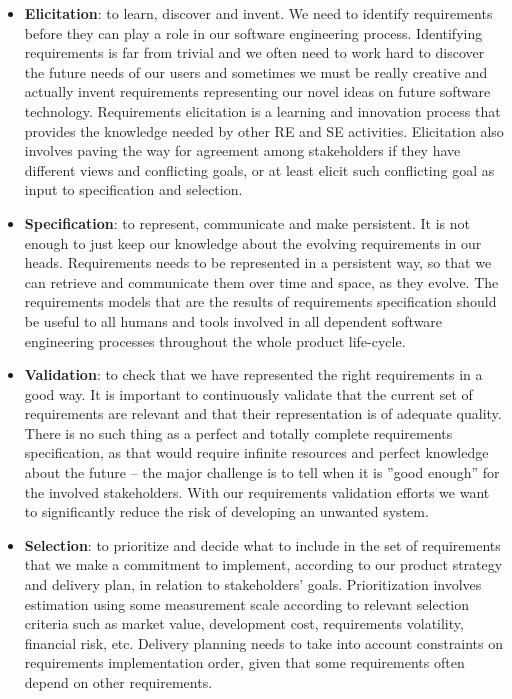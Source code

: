 \begin{itemize}
  \item \textbf{Elicitation}: to learn, discover and invent. We need to identify requirements before they can play a role in our software engineering process. Identifying requirements is far from trivial and we often need to work hard to discover the future needs of our users and sometimes we must be really creative and actually invent requirements representing our novel ideas on future software technology. Requirements elicitation is a learning and innovation process that provides the knowledge needed by other RE and SE activities. Elicitation also involves paving the way for agreement among stakeholders  if they have different views and conflicting goals, or at least elicit such conflicting goal as input to specification and selection.
  \item \textbf{Specification}: to represent, communicate and make persistent. It is not enough to just keep our knowledge about the evolving requirements in our heads. Requirements needs to be represented in a persistent way, so that we can retrieve and communicate them over time and space, as they evolve. The requirements models that are the results of requirements specification should be useful to all humans and tools involved in all dependent software engineering processes throughout the whole product life-cycle.
  \item \textbf{Validation}: to check that we have represented the right requirements in a good way. It is important to continuously validate that the current set of requirements are relevant and that their representation is of adequate quality. There is no such thing as a perfect and totally complete requirements specification, as that would require infinite resources and perfect knowledge about the future -- the major challenge is to tell when it is ''good enough'' for the involved stakeholders. With our requirements validation efforts we want to significantly reduce the risk of developing an unwanted system.
  \item \textbf{Selection}: to prioritize and decide what to include in the set of requirements that we make a commitment to implement, according to our product strategy and delivery plan, in relation to stakeholders' goals. Prioritization involves estimation using some measurement scale according to relevant selection criteria such as market value, development cost, requirements volatility, financial risk, etc. Delivery planning needs to take into account constraints on requirements implementation order, given that some requirements often depend on other requirements. 
\end{itemize}

